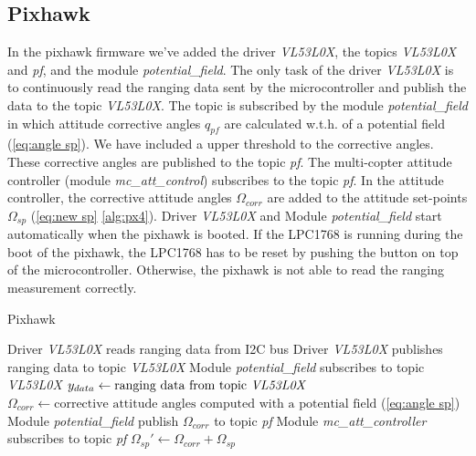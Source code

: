 \subsection{Pixhawk}
\label{subs:pixhawk}
In the pixhawk firmware we've added the driver \textit{VL53L0X}, the topics \textit{VL53L0X} and \textit{pf}, and the module \textit{potential\_field}. The only task of the driver \textit{VL53L0X} is to continuously read the ranging data sent by the microcontroller and publish the data to the topic \textit{VL53L0X}. The topic is subscribed by the module \textit{potential\_field} in which attitude corrective angles $q_{pf}$ are calculated w.t.h. of a potential field (\cref{eq:angle sp}). We have included a upper threshold to the corrective angles. These corrective angles are published to the topic \textit{pf}. The multi-copter attitude controller (module \textit{mc\_att\_control}) subscribes to the topic \textit{pf}. In the attitude controller, the corrective attitude angles $\Omega_{corr}$ are added to the attitude set-points $\Omega_{sp}$ (\cref{eq:new sp} \cref{alg:px4}). Driver \textit{VL53L0X} and Module \textit{potential\_field} start automatically when the pixhawk is booted. If the LPC1768 is running during the boot of the pixhawk, the LPC1768 has to be reset by pushing the button on top of the microcontroller. Otherwise, the pixhawk is not able to read the ranging measurement correctly. 

\begin{algorithm}
	\caption{Pixhawk}\label{alg:px4}
	\begin{algorithmic}[1]
		\State Driver  \textit{VL53L0X} reads ranging data from I2C bus 
		\State Driver  \textit{VL53L0X} publishes ranging data to topic \textit{VL53L0X}
		\State Module \textit{potential\_field} subscribes to topic \textit{VL53L0X}
		\State $y_{data}\gets \text{ranging data from topic \textit{VL53L0X}}$
		\State $\Omega_{corr} \gets \text{corrective attitude angles computed with a potential field}$ (\cref{eq:angle sp})
		\State Module \textit{potential\_field} publish $\Omega_{corr}$ to topic \textit{pf}
		\State Module \textit{mc\_att\_controller} subscribes to topic \textit{pf}
		\State $\Omega_{sp}'\gets \Omega_{corr}+\Omega_{sp}$ 
		\EndProcedure
	\end{algorithmic}
\end{algorithm}

